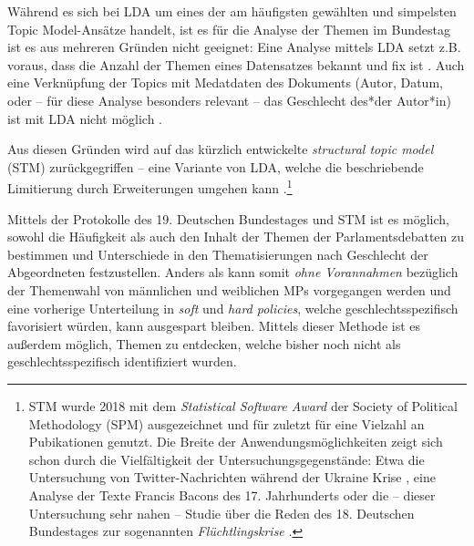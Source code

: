 \documentclass[12pt, 
    twoside=false, 
    bibliography=totoc, 
    numbers=endperiod, 
    headings=normal, 
    toc=chapterentrydotfill
    ]{scrbook}
\begin{document}
Während es sich bei LDA um eines der am häufigsten gewählten und simpelsten Topic Model-Ansätze handelt, ist es für die Analyse der Themen im Bundestag ist es aus mehreren Gründen nicht geeignet:
Eine Analyse mittels LDA setzt z.B. voraus, dass die Anzahl der Themen eines Datensatzes bekannt und fix ist \parencites[93]{niekler_2018}[82f.]{blei_2012}. Auch eine Verknüpfung der Topics mit Medatdaten des Dokuments (Autor, Datum, oder -- für diese Analyse besonders relevant -- das Geschlecht des*der Autor*in) ist mit LDA nicht möglich \parencites[94]{niekler_2018}[82f.]{blei_2012}. 

Aus diesen Gründen wird auf das kürzlich entwickelte \emph{structural topic model} (STM) zurückgegriffen -- eine Variante von LDA, welche die beschriebende Limitierung durch Erweiterungen umgehen kann \parencite[640]{mishler_2015}.\footnote{STM wurde 2018 mit dem \emph{Statistical Software Award} der {Society of Political Methodology} (SPM) ausgezeichnet und für zuletzt für eine Vielzahl an Pubikationen genutzt. Die Breite der Anwendungsmöglichkeiten zeigt sich schon durch die Vielfältigkeit der Untersuchungsgegenstände: Etwa die Untersuchung von Twitter-Nachrichten während der Ukraine Krise \parencite{mishler_2015}, eine Analyse der Texte Francis Bacons des 17. Jahrhunderts \parencite{grajzl_2019} oder die -- dieser Untersuchung sehr nahen -- Studie über die Reden des 18. Deutschen Bundestages zur sogenannten \emph{Flüchtlingskrise} \parencite{geese_2019}.}

Mittels der Protokolle des 19. Deutschen Bundestages und STM ist es möglich, sowohl die Häufigkeit als auch den Inhalt der Themen der Parlamentsdebatten zu bestimmen und Unterschiede in den Thematisierungen nach Geschlecht der Abgeordneten festzustellen. Anders als \textcite{back_2014} kann somit \emph{ohne Vorannahmen} bezüglich der Themenwahl von männlichen und weiblichen MPs vorgegangen werden und eine vorherige Unterteilung in \emph{soft} und \emph{hard policies}, welche geschlechtsspezifisch favorisiert würden, kann ausgespart bleiben. Mittels dieser Methode ist es außerdem möglich, Themen zu entdecken, welche bisher noch nicht als geschlechtsspezifisch identifiziert wurden.
\end{document}
